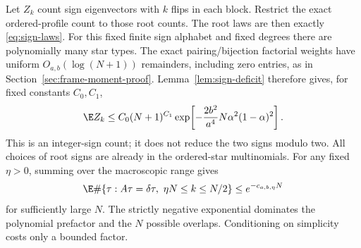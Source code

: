 Let $Z_k$ count sign eigenvectors with $k$ flips in each block.
Restrict the exact ordered-profile count to those root counts. The root
laws are then exactly \eqref{eq:sign-laws}. For this fixed finite sign
alphabet and fixed degrees there are polynomially many star types.
The exact pairing/bijection factorial weights have uniform
$O_{a,b}(\log(N+1))$ remainders, including zero entries, as in
Section~\ref{sec:frame-moment-proof}. Lemma~\ref{lem:sign-deficit}
therefore gives, for fixed constants $C_0,C_1$,
\begin{equation}\label{eq:Boolean-fiber}
 \E Z_k\le C_0(N+1)^{C_1}
 \exp\!\left[-\frac{2b^2}{a^4}N\alpha^2(1-\alpha)^2\right].
\end{equation}
This is an integer-sign count; it does not reduce the two signs
modulo two. All choices of root signs are already in the ordered-star multinomials. For any fixed $\eta>0$, summing over the macroscopic range gives
\begin{equation}\label{eq:macro}
 \E\#\{\tau:A\tau=\delta\tau,\ \eta N\le k\le N/2\}
 \le e^{-c_{a,b,\eta}N}
\end{equation}
for sufficiently large $N$. The strictly negative exponential dominates
the polynomial prefactor and the $N$ possible overlaps. Conditioning
on simplicity costs only a bounded factor.

